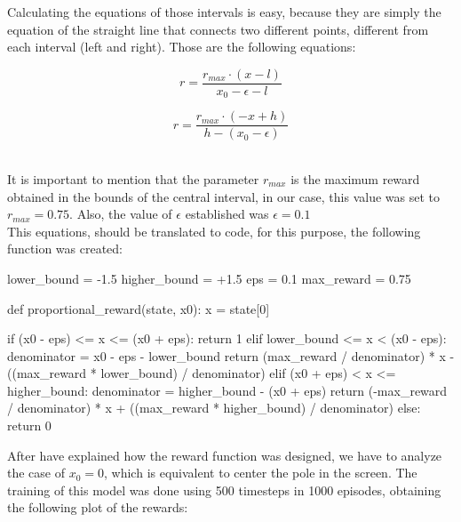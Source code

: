 \documentclass[12pt]{article}
\begin{document}
Calculating the equations of those intervals is easy, because they are simply the equation of the straight line that connects two different points, different from each interval (left and right). Those are the following equations:

\begin{minipage}{0.48\textwidth}
 \begin{center}
    \begin{equation}
         r = \frac{r_{max} \cdot (x - l)}{x_0-\epsilon-l}
    \end{equation}
 \end{center}
\end{minipage}\hfill
\begin{minipage}{0.48\textwidth}
\begin{center}
    \begin{equation}
        r = \frac{r_{max} \cdot (-x + h)}{h-(x_0 - \epsilon)}
    \end{equation}
 \end{center}
\end{minipage}
\\

It is important to mention that the parameter $r_{max}$ is the maximum reward obtained in the bounds of the central interval, in our case, this value was set to $r_{max} = 0.75$. Also, the value of $\epsilon$ established was $\epsilon=0.1$\\

This equations, should be translated to code, for this purpose, the following function was created:

\begin{pycode}
lower_bound = -1.5
higher_bound = +1.5
eps = 0.1
max_reward = 0.75

def proportional_reward(state, x0):
    x = state[0]

    if (x0 - eps) <= x <= (x0 + eps):
        return 1
    elif lower_bound <= x < (x0 - eps):
        denominator = x0 - eps - lower_bound
        return (max_reward / denominator) * x - ((max_reward * lower_bound) / denominator)
    elif (x0 + eps) < x <= higher_bound:
        denominator = higher_bound - (x0 + eps)
        return (-max_reward / denominator) * x + ((max_reward * higher_bound) / denominator)
    else:
        return 0
\end{pycode}

After have explained how the reward function was designed, we have to analyze the case of $x_0 = 0$, which is equivalent to center the pole in the screen. The training of this model was done using 500 timesteps in 1000 episodes, obtaining the following plot of the rewards:
\end{document}
